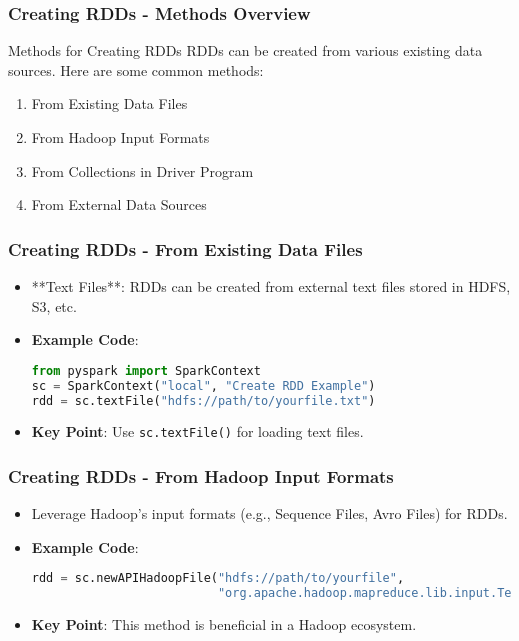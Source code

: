 \documentclass[aspectratio=169]{beamer}
\begin{document}
\begin{frame}[fragile]
    \frametitle{Creating RDDs - Methods Overview}
    \begin{block}{Methods for Creating RDDs}
        RDDs can be created from various existing data sources. Here are some common methods:
    \end{block}
    \begin{enumerate}
        \item From Existing Data Files
        \item From Hadoop Input Formats
        \item From Collections in Driver Program
        \item From External Data Sources
    \end{enumerate}
\end{frame}

\begin{frame}[fragile]
    \frametitle{Creating RDDs - From Existing Data Files}
    \begin{itemize}
        \item **Text Files**: RDDs can be created from external text files stored in HDFS, S3, etc.
        \item \textbf{Example Code}:
        \begin{lstlisting}[language=Python]
from pyspark import SparkContext
sc = SparkContext("local", "Create RDD Example")
rdd = sc.textFile("hdfs://path/to/yourfile.txt")
        \end{lstlisting}
        \item \textbf{Key Point}: Use \texttt{sc.textFile()} for loading text files.
    \end{itemize}
\end{frame}

\begin{frame}[fragile]
    \frametitle{Creating RDDs - From Hadoop Input Formats}
    \begin{itemize}
        \item Leverage Hadoop's input formats (e.g., Sequence Files, Avro Files) for RDDs.
        \item \textbf{Example Code}:
        \begin{lstlisting}[language=Python]
rdd = sc.newAPIHadoopFile("hdfs://path/to/yourfile", 
                          "org.apache.hadoop.mapreduce.lib.input.TextInputFormat")
        \end{lstlisting}
        \item \textbf{Key Point}: This method is beneficial in a Hadoop ecosystem.
    \end{itemize}
\end{frame}
\end{document}
